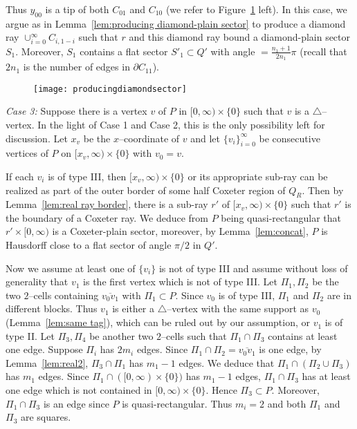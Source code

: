 \documentclass[11pt]{amsart}
\theoremstyle{definition}
\begin{document}
Thus $y_{00}$ is a tip of both $C_{01}$ and $C_{10}$ (we refer to Figure~\ref{f:producediamondsector} left). In this case, we argue as in Lemma~\ref{lem:producing diamond-plain sector} to produce a diamond ray $\cup_{i=0}^{\infty}C_{i,1-i}$ such that $r$ and this diamond ray bound a diamond-plain sector $S_1$. Moreover, $S_1$ contains a flat sector $S'_1\subset Q'$ with angle $=\frac{n_1+1}{2n_1}\pi$ (recall that $2n_1$ is the number of edges in $\partial C_{11}$).

\begin{figure}[h!]
	\centering
	\texttt{[image: producingdiamondsector]}
	\caption{}
	\label{f:producediamondsector}
\end{figure}

\emph{Case 3:} Suppose there is a vertex $v$ of $P$ in $[0,\infty)\times\{0\}$ such that $v$ is a $\triangle$--vertex. In the light of Case 1 and Case 2, this is the only possibility left for discussion. Let $x_v$ be the $x$--coordinate of $v$ and let $\{v_i\}_{i=0}^{\infty}$ be consecutive vertices of $P$ on $[x_v,\infty)\times\{0\}$ with $v_0=v$. 

If each $v_i$ is of type III, then $[x_v,\infty)\times\{0\}$ or its appropriate sub-ray can be realized as part of the outer border of some half Coxeter region of $Q_R$. Then by Lemma~\ref{lem:real ray border}, there is a sub-ray $r'$ of $[x_v,\infty)\times\{0\}$ such that $r'$ is the boundary of a Coxeter ray. We deduce from $P$ being quasi-rectangular that $r'\times [0,\infty)$ is a Coxeter-plain sector, moreover, by Lemma~\ref{lem:concat}, $P$ is Hausdorff close to a flat sector of angle $\pi/2$ in $Q'$.

Now we assume at least one of $\{v_i\}$ is not of type III and assume without loss of generality that $v_1$ is the first vertex which is not of type III. Let $\Pi_1,\Pi_2$ be the two $2$--cells containing $\overline{v_0v_1}$ with $\Pi_1\subset P$. Since $v_0$ is of type III, $\Pi_1$ and $\Pi_2$ are in different blocks. Thus $v_1$ is either a $\triangle$--vertex with the same support as $v_0$ (Lemma~\ref{lem:same tag}), which can be ruled out by our assumption, or $v_1$ is of type II. Let $\Pi_3,\Pi_4$ be another two $2$--cells such that $\Pi_1\cap\Pi_3$ contains at least one edge. Suppose $\Pi_i$ has $2m_i$ edges. Since $\Pi_1\cap\Pi_2=\overline{v_0v_1}$ is one edge, by Lemma~\ref{lem:real2}, $\Pi_3\cap \Pi_1$ has $m_1-1$ edges. We deduce that $\Pi_1\cap (\Pi_2\cup\Pi_3)$ has $m_1$ edges. Since $\Pi_1\cap ([0,\infty)\times\{0\})$ has $m_1-1$ edges, $\Pi_1\cap\Pi_3$ has at least one edge which is not contained in $[0,\infty)\times\{0\}$. Hence $\Pi_3\subset P$. Moreover, $\Pi_1\cap \Pi_3$ is an edge since $P$ is quasi-rectangular. Thus $m_i=2$ and both $\Pi_1$ and $\Pi_3$ are squares.
\end{document}
